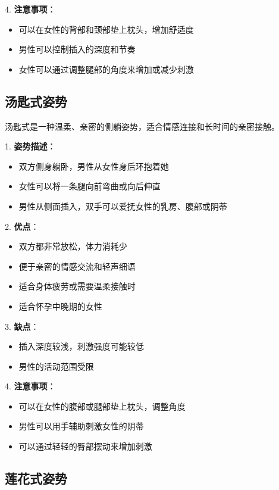 \documentclass[12pt,UTF8]{ctexbook}
\begin{document}
4. \textbf{注意事项}：
  \begin{itemize}
  \item 可以在女性的背部和颈部垫上枕头，增加舒适度
  \item 男性可以控制插入的深度和节奏
  \item 女性可以通过调整腿部的角度来增加或减少刺激
  \end{itemize}

\subsection{汤匙式姿势}

汤匙式是一种温柔、亲密的侧躺姿势，适合情感连接和长时间的亲密接触。

1. \textbf{姿势描述}：
  \begin{itemize}
  \item 双方侧身躺卧，男性从女性身后环抱着她
  \item 女性可以将一条腿向前弯曲或向后伸直
  \item 男性从侧面插入，双手可以爱抚女性的乳房、腹部或阴蒂
  \end{itemize}

2. \textbf{优点}：
  \begin{itemize}
  \item 双方都非常放松，体力消耗少
  \item 便于亲密的情感交流和轻声细语
  \item 适合身体疲劳或需要温柔接触时
  \item 适合怀孕中晚期的女性
  \end{itemize}

3. \textbf{缺点}：
  \begin{itemize}
  \item 插入深度较浅，刺激强度可能较低
  \item 男性的活动范围受限
  \end{itemize}

4. \textbf{注意事项}：
  \begin{itemize}
  \item 可以在女性的腹部或腿部垫上枕头，调整角度
  \item 男性可以用手辅助刺激女性的阴蒂
  \item 可以通过轻轻的臀部摆动来增加刺激
  \end{itemize}

\subsection{莲花式姿势}
\end{document}
